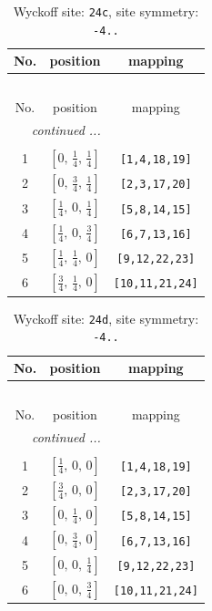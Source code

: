 \documentclass[fleqn,8pt]{jsarticle}
\begin{document}
\renewcommand{\arraystretch}{1.2}
\begin{longtable}{ccc}
\caption{Wyckoff site: {\tt 24c}, site symmetry: {\tt -4..}}
 \\
 \hline \hline
No. & position & mapping \\ \hline \endfirsthead

\multicolumn{2}{l}{\tablename\ \thetable{}} \\
 \hline \hline
No. & position & mapping \\ \hline \endhead

 \hline \hline
\multicolumn{2}{r}{\footnotesize\it continued ...} \\ \endfoot

 \hline \hline
\multicolumn{2}{r}{} \\ \endlastfoot

1 & $\left[ 0,\, \frac{1}{4},\, \frac{1}{4} \right]$ & {\tt [1,4,18,19]} \\ \hline
2 & $\left[ 0,\, \frac{3}{4},\, \frac{1}{4} \right]$ & {\tt [2,3,17,20]} \\ \hline
3 & $\left[ \frac{1}{4},\, 0,\, \frac{1}{4} \right]$ & {\tt [5,8,14,15]} \\ \hline
4 & $\left[ \frac{1}{4},\, 0,\, \frac{3}{4} \right]$ & {\tt [6,7,13,16]} \\ \hline
5 & $\left[ \frac{1}{4},\, \frac{1}{4},\, 0 \right]$ & {\tt [9,12,22,23]} \\ \hline
6 & $\left[ \frac{3}{4},\, \frac{1}{4},\, 0 \right]$ & {\tt [10,11,21,24]} \\
\end{longtable}
\renewcommand{\arraystretch}{1.2}
\begin{longtable}{ccc}
\caption{Wyckoff site: {\tt 24d}, site symmetry: {\tt -4..}}
 \\
 \hline \hline
No. & position & mapping \\ \hline \endfirsthead

\multicolumn{2}{l}{\tablename\ \thetable{}} \\
 \hline \hline
No. & position & mapping \\ \hline \endhead

 \hline \hline
\multicolumn{2}{r}{\footnotesize\it continued ...} \\ \endfoot

 \hline \hline
\multicolumn{2}{r}{} \\ \endlastfoot

1 & $\left[ \frac{1}{4},\, 0,\, 0 \right]$ & {\tt [1,4,18,19]} \\ \hline
2 & $\left[ \frac{3}{4},\, 0,\, 0 \right]$ & {\tt [2,3,17,20]} \\ \hline
3 & $\left[ 0,\, \frac{1}{4},\, 0 \right]$ & {\tt [5,8,14,15]} \\ \hline
4 & $\left[ 0,\, \frac{3}{4},\, 0 \right]$ & {\tt [6,7,13,16]} \\ \hline
5 & $\left[ 0,\, 0,\, \frac{1}{4} \right]$ & {\tt [9,12,22,23]} \\ \hline
6 & $\left[ 0,\, 0,\, \frac{3}{4} \right]$ & {\tt [10,11,21,24]} \\
\end{longtable}
\end{document}
